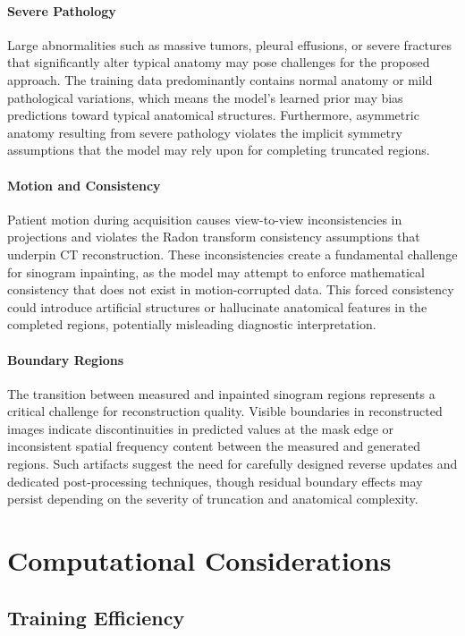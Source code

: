 \paragraph{Severe Pathology}
Large abnormalities such as massive tumors, pleural effusions, or severe fractures that significantly alter typical anatomy may pose challenges for the proposed approach. The training data predominantly contains normal anatomy or mild pathological variations, which means the model's learned prior may bias predictions toward typical anatomical structures. Furthermore, asymmetric anatomy resulting from severe pathology violates the implicit symmetry assumptions that the model may rely upon for completing truncated regions.

\paragraph{Motion and Consistency}
Patient motion during acquisition causes view-to-view inconsistencies in projections and violates the Radon transform consistency assumptions that underpin CT reconstruction. These inconsistencies create a fundamental challenge for sinogram inpainting, as the model may attempt to enforce mathematical consistency that does not exist in motion-corrupted data. This forced consistency could introduce artificial structures or hallucinate anatomical features in the completed regions, potentially misleading diagnostic interpretation.

\paragraph{Boundary Regions}
The transition between measured and inpainted sinogram regions represents a critical challenge for reconstruction quality. Visible boundaries in reconstructed images indicate discontinuities in predicted values at the mask edge or inconsistent spatial frequency content between the measured and generated regions. Such artifacts suggest the need for carefully designed reverse updates and dedicated post-processing techniques, though residual boundary effects may persist depending on the severity of truncation and anatomical complexity.

\section{Computational Considerations}

\subsection{Training Efficiency}

